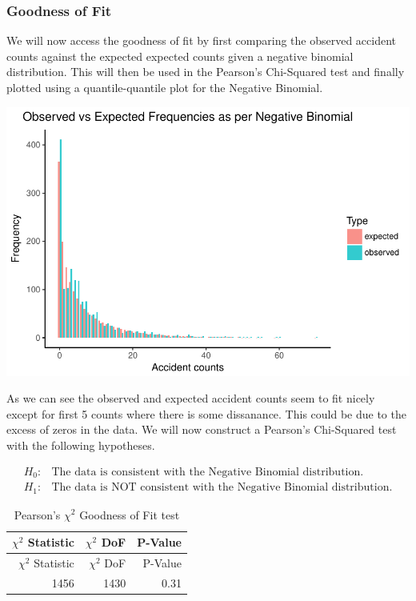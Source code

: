 \documentclass[11pt,preprint, authoryear]{elsarticle}
\numberwithin{equation}{section}
\numberwithin{figure}{section}
\numberwithin{table}{section}
\begin{document}
\subsubsection{Goodness of Fit}\label{goodness-of-fit}

We will now access the goodness of fit by first comparing the observed
accident counts against the expected expected counts given a negative
binomial distribution. This will then be used in the Pearson's
Chi-Squared test and finally plotted using a quantile-quantile plot for
the Negative Binomial.

\includegraphics{likelihood_files/figure-latex/best_model_fit-1.pdf}

As we can see the observed and expected accident counts seem to fit
nicely except for first 5 counts where there is some dissanance. This
could be due to the excess of zeros in the data. We will now construct a
Pearson's Chi-Squared test with the following hypotheses.

\begin{align*}
H_0: & \text{The data is consistent with the Negative Binomial distribution.}\\
H_1: & \text{The data is NOT consistent with the Negative Binomial distribution.} 
\end{align*}

\begin{longtable}[]{@{}rrr@{}}
\caption{Pearson's \(\chi^2\) Goodness of Fit test}\tabularnewline
\toprule
\(\chi^2\) Statistic & \(\chi^2\) DoF & P-Value\tabularnewline
\midrule
\endfirsthead
\toprule
\(\chi^2\) Statistic & \(\chi^2\) DoF & P-Value\tabularnewline
\midrule
\endhead
1456 & 1430 & 0.31\tabularnewline
\bottomrule
\end{longtable}
\end{document}
